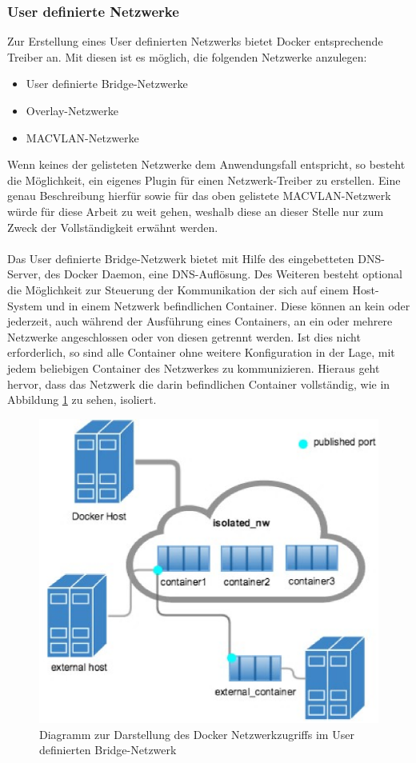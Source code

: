 \subsubsection{User definierte Netzwerke}
Zur Erstellung eines User definierten Netzwerks bietet Docker entsprechende Treiber an. Mit diesen ist es möglich, die folgenden Netzwerke anzulegen:
\begin{itemize}
	\item User definierte Bridge-Netzwerke
	\item Overlay-Netzwerke
	\item MACVLAN-Netzwerke
\end{itemize}
Wenn keines der gelisteten Netzwerke dem Anwendungsfall entspricht, so besteht die Möglichkeit, ein eigenes Plugin für einen Netzwerk-Treiber zu erstellen. Eine genau Beschreibung hierfür sowie für das oben gelistete MACVLAN-Netzwerk würde für diese Arbeit zu weit gehen, weshalb diese an dieser Stelle nur zum Zweck der Vollständigkeit erwähnt werden.
\\\\
Das User definierte Bridge-Netzwerk bietet mit Hilfe des eingebetteten DNS-Server, des Docker Daemon, eine DNS-Auflösung. Des Weiteren besteht optional die Möglichkeit zur Steuerung der Kommunikation der sich auf einem Host-System und in einem Netzwerk befindlichen Container. Diese können an kein oder jederzeit, auch während der Ausführung eines Containers, an ein oder mehrere Netzwerke angeschlossen oder von diesen getrennt werden. Ist dies nicht erforderlich, so sind alle Container ohne weitere Konfiguration in der Lage, mit jedem beliebigen Container des Netzwerkes zu kommunizieren. Hieraus geht hervor, dass das Netzwerk die darin befindlichen Container vollständig, wie in Abbildung \ref{fig:dockerportpuex} zu sehen, isoliert.
\begin{figure}
	\centering
	\includegraphics[width=0.7\linewidth]{figures/DockerPortPuEx}
	\caption[Docker Netzwerkzugriff]{Diagramm zur Darstellung des Docker Netzwerkzugriffs im User definierten Bridge-Netzwerk}
	\label{fig:dockerportpuex}
\end{figure}
